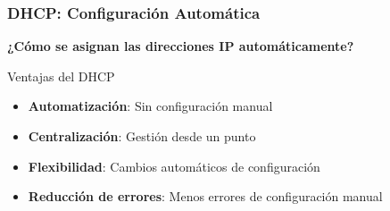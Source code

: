 \documentclass[aspectratio=169]{beamer}
\begin{document}
          \begin{frame}
            \frametitle{DHCP: Configuración Automática}
            
            \begin{center}
            \Large \textbf{¿Cómo se asignan las direcciones IP automáticamente?}
            \end{center}
            \begin{block}{Ventajas del DHCP}
            \begin{itemize}
            \item \textbf{Automatización}: Sin configuración manual
            \item \textbf{Centralización}: Gestión desde un punto
            \item \textbf{Flexibilidad}: Cambios automáticos de configuración
            \item \textbf{Reducción de errores}: Menos errores de configuración manual
            \end{itemize}
            \end{block}
            \end{frame}
            
\end{document}

